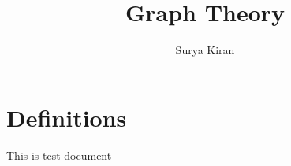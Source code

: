 \documentclass[a4paper,11pt]{article}
\begin{document}
\title{Graph Theory}
\author{Surya Kiran}
\maketitle
\section{Definitions}
This is test document
\end{document}
